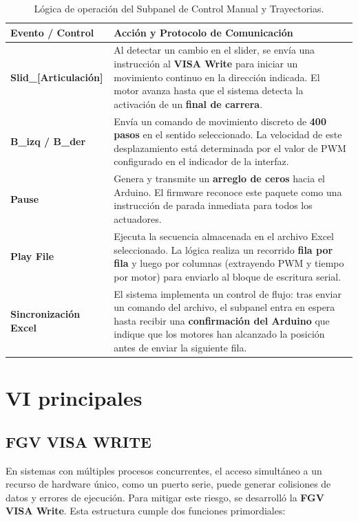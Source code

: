\begin{table}[h!]
	\centering
	\renewcommand{\arraystretch}{1.5}
	\caption{Lógica de operación del Subpanel de Control Manual y Trayectorias.}
	\label{tab:subpanel_control}
	\begin{tabularx}{\textwidth}{|l|X|}
		\hline
		\rowcolor{blue!10}
		\textbf{Evento / Control} & \textbf{Acción y Protocolo de Comunicación} \\ \hline
		\textbf{Slid\_[Articulación]} & Al detectar un cambio en el slider, se envía una instrucción al \textbf{VISA Write} para iniciar un movimiento continuo en la dirección indicada. El motor avanza hasta que el sistema detecta la activación de un \textbf{final de carrera}. \\ \hline
		\textbf{B\_izq / B\_der} & Envía un comando de movimiento discreto de \textbf{400 pasos} en el sentido seleccionado. La velocidad de este desplazamiento está determinada por el valor de PWM configurado en el indicador de la interfaz. \\ \hline
		\textbf{Pause} & Genera y transmite un \textbf{arreglo de ceros} hacia el Arduino. El firmware reconoce este paquete como una instrucción de parada inmediata para todos los actuadores. \\ \hline
		\textbf{Play File} & Ejecuta la secuencia almacenada en el archivo Excel seleccionado. La lógica realiza un recorrido \textbf{fila por fila} y luego por columnas (extrayendo PWM y tiempo por motor) para enviarlo al bloque de escritura serial. \\ \hline
		\textbf{Sincronización Excel} & El sistema implementa un control de flujo: tras enviar un comando del archivo, el subpanel entra en espera hasta recibir una \textbf{confirmación del Arduino} que indique que los motores han alcanzado la posición antes de enviar la siguiente fila. \\ \hline
	\end{tabularx}
\end{table}
\clearpage

\section{VI principales}
\subsection{FGV VISA WRITE}


En sistemas con múltiples procesos concurrentes, el acceso simultáneo a un recurso de hardware único, como un puerto serie, puede generar colisiones de datos y errores de ejecución. Para mitigar este riesgo, se desarrolló la \textbf{FGV VISA Write}. Esta estructura cumple dos funciones primordiales:

